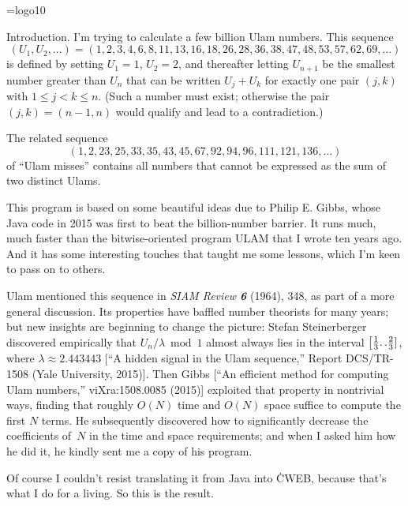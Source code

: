 
\def\bslash{/\mkern-4.5mu/}  %
\font\logo=logo10
\def\MP{{\logo METAPOST}}

\let\possiblyflakyepsfbox=\epsfbox
\def\epsfbox#1{\hbox{\possiblyflakyepsfbox{#1}}}

\let\mod=\bmod

\datethis

Introduction. I'm trying to calculate a few billion Ulam numbers.
This sequence
$$(U_1,U_2,\ldots{})=(1,2,3,4,6,8,11,13,16,18,
26,28,36,38,47,48,53,57,62,69,\ldots{})$$
is defined by setting $U_1=1$, $U_2=2$, and thereafter letting
$U_{n+1}$ be the smallest number greater than $U_n$ that can be
written $U_j+U_k$ for exactly one pair $(j,k)$ with $1\le j<k\le n$.
(Such a number must exist; otherwise the pair $(j,k)=(n-1,n)$ would
qualify and lead to a contradiction.)

The related sequence
$$(1, 2, 23, 25, 33, 35, 43, 45, 67, 92, 94, 96, 111, 121, 136,\ldots{})$$
of ``Ulam misses'' contains all numbers that cannot be
expressed as the sum of two distinct Ulams.

This program is based on some beautiful ideas due to Philip E. Gibbs,
whose Java code in 2015 was first to beat the billion-number barrier.
It runs much, much faster than the bitwise-oriented program {\mc ULAM}
that I wrote ten years ago. And it has some interesting touches that
taught me some lessons, which I'm keen to pass on to others.

Ulam mentioned this sequence in {\sl SIAM Review\/ \bf6} (1964), 348,
as part of a more general discussion. Its properties have baffled number
theorists for many years; but new insights are beginning to change the picture:
Stefan Steinerberger discovered empirically that $U_n/\lambda\mod1$ almost
always lies in the interval $\bigl[{1\over3}.\,.{2\over3}]$, where
$\lambda\approx2.443443$ [``A hidden signal in the Ulam sequence,''
Report DCS/TR-1508 (Yale University, 2015)].
Then Gibbs [``An efficient method for computing Ulam numbers,''
viXra:1508.0085 (2015)] exploited that property in nontrivial ways,
finding that roughly $O(N)$ time and $O(N)$ space suffice to compute
the first $N$ terms. He subsequently discovered how to significantly
decrease the coefficients of~$N$ in the time and space requirements; and when I
asked him how he did it, he kindly sent me a copy of his program.

Of course I couldn't resist translating it from Java into \.{CWEB},
because that's what I do for a living. So this is the result.

